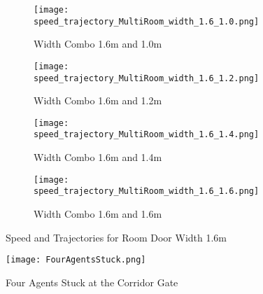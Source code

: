 \begin{figure}[h]
    \centering
        \begin{subfigure}[b]{.45\linewidth}
        \texttt{[image: 
            speed\_trajectory\_MultiRoom\_width\_1.6\_1.0.png]}
        \caption{Width Combo 1.6m and 1.0m}
        \label{fig:width_combo_1.6_1.0m}
    \end{subfigure}
    \begin{subfigure}[b]{.45\linewidth}
        \texttt{[image: 
            speed\_trajectory\_MultiRoom\_width\_1.6\_1.2.png]}
        \caption{Width Combo 1.6m and 1.2m}
        \label{fig:width_combo_1.6_1.2m}
    \end{subfigure}

    \begin{subfigure}[b]{.45\linewidth}
        \texttt{[image: 
            speed\_trajectory\_MultiRoom\_width\_1.6\_1.4.png]}
        \caption{Width Combo 1.6m and 1.4m}
        \label{fig:width_combo_1.6_1.4m}
    \end{subfigure}
        \begin{subfigure}[b]{.45\linewidth}
        \texttt{[image: 
            speed\_trajectory\_MultiRoom\_width\_1.6\_1.6.png]}
        \caption{Width Combo 1.6m and 1.6m}
        \label{fig:width_combo_1.6_1.6m}
    \end{subfigure}

    \caption{Speed and Trajectories for Room Door Width 1.6m}
    \label{fig:width_combo_1.6_x}
\end{figure}

\begin{figure}
    \centering
    \texttt{[image: FourAgentsStuck.png]}
    \caption{Four Agents Stuck at the Corridor Gate}
    \label{fig:four_agents_stuck}
\end{figure}